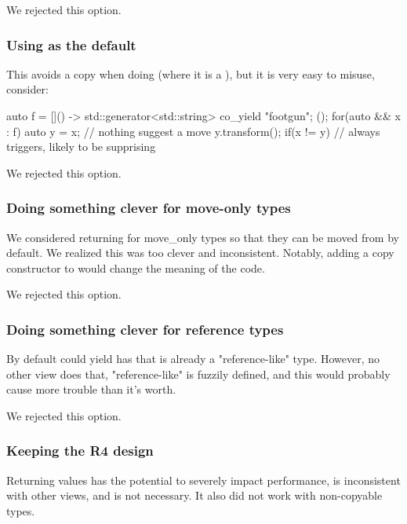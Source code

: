 \documentclass{wg21}
\begin{document}
We rejected this option.

\subsubsection{Using  as the default}

This avoids a copy when doing  (where it is a ),
but it is very easy to misuse, consider:

\begin{colorblock}
auto f = []() -> std::generator<std::string> { co_yield "footgun"; }();
for(auto && x : f) {
    auto y = x; // nothing suggest a move
    y.transform();
    if(x != y) {
        // always triggers, likely to be supprising
    }
}

\end{colorblock}
We rejected this option.


\subsubsection{Doing something clever for move-only types}

We considered returning  for move_only types so that they can be moved from by default.
We realized this was too clever and inconsistent.
Notably, adding a copy constructor to  would change the meaning of the code.

We rejected this option.

\subsubsection{Doing something clever for reference types}

By default  could yield  has that is already a "reference-like" type.
However, no other view does that, "reference-like" is fuzzily defined, and this would probably cause more trouble than it's worth.

We rejected this option.

\subsubsection{Keeping the R4 design}

Returning values has the potential to severely impact performance, is inconsistent with other views, and is not necessary.
It also did not work with non-copyable types.
\end{document}
